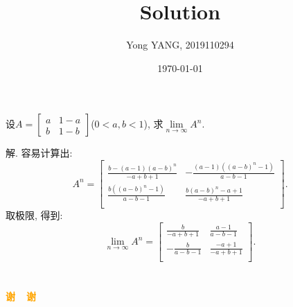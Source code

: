 \documentclass[aspectratio=43]{beamer}
\title{Solution} %
\author[Yong YANG]{Yong YANG, 2019110294}
\institute[BUPT]{
	Beijing University of Posts and Telecommunications%
} %
\date{\today}
\begin{document}
	
	\frame{\titlepage}
	
   \section{}
\begin{frame}
	设$A = \begin{bmatrix}
		a & 1-a\\
		b & 1-b
	\end{bmatrix}$($0<a,b<1$), 求$\lim\limits_{n\to\infty}A^n$.
	\begin{block}{解.}
		容易计算出:
		\begin{equation*}
			A^n = \begin{bmatrix}
				\frac{b-(a-1) (a-b)^n}{-a+b+1} & -\frac{(a-1) \left((a-b)^n-1\right)}{a-b-1} \\
				\frac{b \left((a-b)^n-1\right)}{a-b-1} & \frac{b (a-b)^n-a+1}{-a+b+1} \\
			\end{bmatrix}.
		\end{equation*}
		取极限, 得到:
		\begin{equation*}
			\lim\limits_{n\to\infty}A^n = \begin{bmatrix}
			\frac{b}{-a+b+1} & \frac{a-1}{a-b-1} \\
			-\frac{b}{a-b-1} & \frac{-a+1}{-a+b+1} \\
			\end{bmatrix}.
		\end{equation*}
	\end{block}
	
	
\end{frame}


\section{}
\begin{frame}{}
\centering
\Huge\bfseries
\textcolor{orange}{谢~~谢}
\end{frame}
\end{document}
